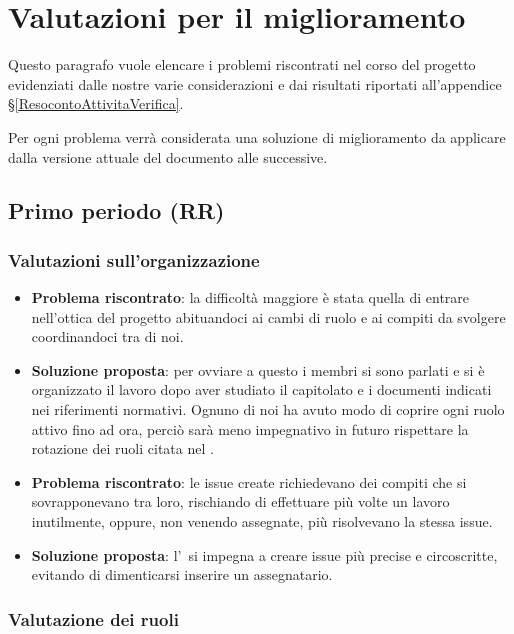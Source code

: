 \newpage
\section{Valutazioni per il miglioramento}	\label{valutazioni per il miglioramento}

	Questo paragrafo vuole elencare i problemi riscontrati nel corso del progetto evidenziati dalle nostre varie considerazioni e dai risultati riportati all'appendice \S\ref{ResocontoAttivitaVerifica}.

	Per ogni problema verrà considerata una soluzione di miglioramento da applicare dalla versione attuale del documento alle successive.
    
    \subsection{Primo periodo (RR)}

	\subsubsection{Valutazioni sull'organizzazione}
		\begin{itemize}
			\item \textbf{Problema riscontrato}: la difficoltà maggiore è stata quella di entrare nell'ottica del progetto abituandoci ai cambi di ruolo e ai compiti da svolgere coordinandoci tra di noi.
			\item \textbf{Soluzione proposta}: per ovviare a questo i membri si sono parlati e si è organizzato il lavoro dopo aver studiato il capitolato e i documenti indicati nei riferimenti normativi. Ognuno di noi ha avuto modo di coprire ogni ruolo attivo fino ad ora, perciò sarà meno impegnativo in futuro rispettare la rotazione dei ruoli citata nel \PdPd.
			\item \textbf{Problema riscontrato}: le issue create richiedevano dei compiti che si sovrapponevano tra loro, rischiando di effettuare più volte un lavoro inutilmente, oppure, non venendo assegnate, più  risolvevano la stessa issue.
			\item \textbf{Soluzione proposta}: l'\Amm\ si impegna a creare issue più precise e circoscritte, evitando di dimenticarsi inserire un assegnatario.
		\end{itemize}


	\subsubsection{Valutazione dei ruoli}

